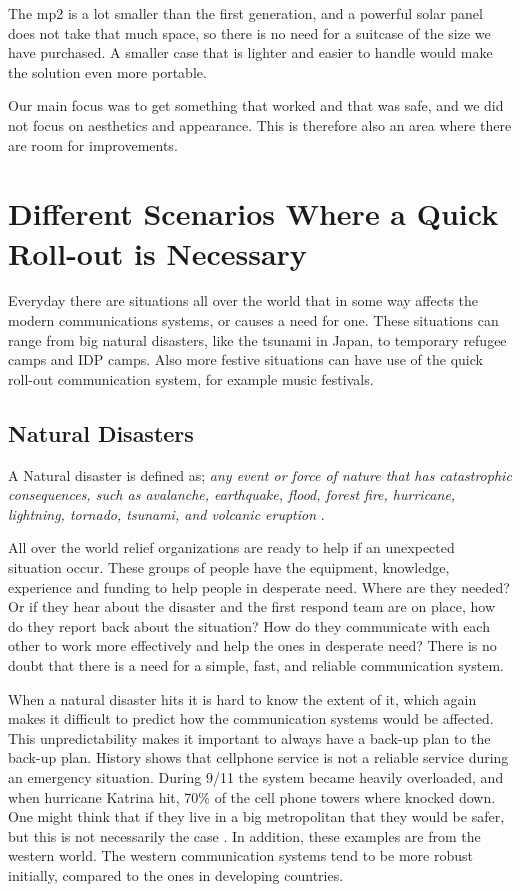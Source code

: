 The \gls{mp2} is a lot smaller than the first generation, and a powerful solar panel does not take that much space, so there is no need for a suitcase of the size we have purchased. A smaller case that is lighter and easier to handle would make the solution even more portable. 

Our main focus was to get something that worked and that was safe, and we did not focus on aesthetics and appearance. This is therefore also an area where there are room for improvements. 

 
\section{Different Scenarios Where a Quick Roll-out is Necessary}
Everyday there are situations all over the world that in some way affects the modern communications systems, or causes a need for one.  These situations can range from big natural disasters, like the tsunami in Japan, to temporary refugee camps and IDP camps. Also more festive situations can have use of the quick roll-out communication system, for example music festivals. 

\subsection{Natural Disasters}
A Natural disaster is defined as; \textit{any event or force of nature that has catastrophic consequences, such as avalanche, earthquake, flood, forest fire, hurricane, lightning, tornado, tsunami, and volcanic eruption} \cite{naturalDisaster}.

All over the world relief organizations are ready to help if an unexpected situation occur. These groups of people have the equipment, knowledge, experience and funding to help people in desperate need. Where are they needed? Or if they hear about the disaster and the first respond team are on place, how do they report back about the situation? How do they communicate with each other to work more effectively and help the ones in desperate need? There is no doubt that there is a need for a simple, fast, and reliable communication system.

When a natural disaster hits it is hard to know the extent of it, which  again makes it difficult to predict how the communication systems would be affected. This unpredictability makes it important to always have a back-up plan to the back-up plan. History shows that cellphone service is not a reliable service during an emergency situation. During 9/11 the system became heavily overloaded, and when hurricane Katrina hit, 70\% of the cell phone towers where knocked down. One might think that if they live in a big metropolitan that they would be safer, but this is not necessarily the case \cite{disasterComm}. In addition, these examples are from the western world. The western communication systems tend to be more robust initially, compared to the ones in developing countries. 

